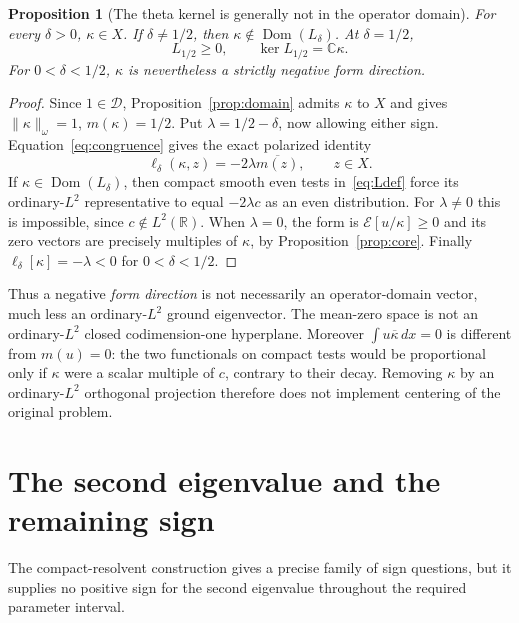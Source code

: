 \documentclass[11pt,a4paper]{article}
\numberwithin{equation}{section}
\newtheorem{proposition}[theorem]{Proposition}
\theoremstyle{remark}
\newcommand{\R}{\mathbb R}
\newcommand{\C}{\mathbb C}
\newcommand{\E}{\mathcal E}
\newcommand{\D}{\mathcal D}
\newcommand{\dom}{\operatorname{Dom}}
\newcommand{\norm}[1]{\lVert #1\rVert}
\begin{document}
\begin{proposition}[The theta kernel is generally not in the operator domain]\label{prop:kdomain}
For every $\delta>0$, $\kappa\in X$. If $\delta\ne1/2$, then $\kappa\notin\dom(L_\delta)$. At $\delta=1/2$,
\begin{equation}\label{eq:halfkernel}
 L_{1/2}\ge0,\qquad \ker L_{1/2}=\C\kappa.
\end{equation}
For $0<\delta<1/2$, $\kappa$ is nevertheless a strictly negative form direction.
\end{proposition}
\begin{proof}
Since $1\in\D$, Proposition~\ref{prop:domain} admits $\kappa$ to $X$ and gives $\norm{\kappa}_\omega=1$, $m(\kappa)=1/2$. Put $\lambda=1/2-\delta$, now allowing either sign. Equation~\eqref{eq:congruence} gives the exact polarized identity
\begin{equation}\label{eq:sourcerow}
 \ell_\delta(\kappa,z)=-2\lambda\overline{m(z)},\qquad z\in X.
\end{equation}
If $\kappa\in\dom(L_\delta)$, then compact smooth even tests in~\eqref{eq:Ldef} force its ordinary-$L^2$ representative to equal $-2\lambda c$ as an even distribution. For $\lambda\ne0$ this is impossible, since $c\notin L^2(\R)$. When $\lambda=0$, the form is $\E[u/\kappa]\ge0$ and its zero vectors are precisely multiples of $\kappa$, by Proposition~\ref{prop:core}. Finally $\ell_\delta[\kappa]=-\lambda<0$ for $0<\delta<1/2$.
\end{proof}

Thus a negative \emph{form direction} is not necessarily an operator-domain vector, much less an ordinary-$L^2$ ground eigenvector. The mean-zero space is not an ordinary-$L^2$ closed codimension-one hyperplane. Moreover $\int u\overline\kappa\,dx=0$ is different from $m(u)=0$: the two functionals on compact tests would be proportional only if $\kappa$ were a scalar multiple of $c$, contrary to their decay. Removing $\kappa$ by an ordinary-$L^2$ orthogonal projection therefore does not implement centering of the original problem.

\section{The second eigenvalue and the remaining sign}\label{sec:sign}

The compact-resolvent construction gives a precise family of sign questions, but it supplies no positive sign for the second eigenvalue throughout the required parameter interval.
\end{document}

